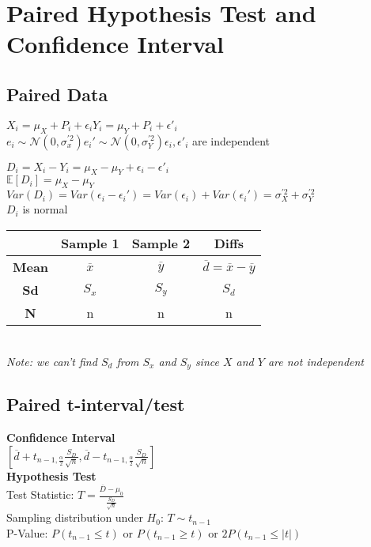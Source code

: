 \documentclass{article}
\begin{document}
\section{Paired Hypothesis Test and Confidence Interval}
\label{sec:pair}
\subsection{Paired Data}
\begin{center}
    $X_i=\mu_X+P_i+\epsilon_i$\hspace*{0.5in}$Y_i=\mu_Y+P_i+\epsilon'_i$\\
    $e_i\sim\mathcal{N}(0,\sigma_x^{'2})$\hspace*{0.5in}$e_i'\sim\mathcal{N}(0,\sigma_Y^{'2})$\hspace*{0.5in}$\epsilon_i,\epsilon'_i$ are independent
\end{center}
$D_i=X_i-Y_i=\mu_X-\mu_Y+\epsilon_i-\epsilon'_i$\\
$\mathbb{E}[D_i]=\mu_X-\mu_Y$\\
$Var(D_i)=Var(\epsilon_i-\epsilon_i')=Var(\epsilon_i)+Var(\epsilon_i')=\sigma_X^{'2}+\sigma_Y^{'2}$\\
$D_i$ is normal\\
\begin{tabular}{c|c|c|c}
     & \textbf{Sample 1} & \textbf{Sample 2} & \textbf{Diffs} \\
     \hline
    \textbf{Mean} & $\overline{x}$ & $\overline{y}$ & $\overline{d}=\overline{x}-\overline{y}$\\
    \hline
    \textbf{Sd} & $S_x$ & $S_y$ & $S_d$\\
    \hline
    \textbf{N} & n & n & n
\end{tabular}\\
\textit{Note: we can't find $S_d$ from $S_x$ and $S_y$ since $X$ and $Y$ are not independent}
\subsection{Paired t-interval/test}
\textbf{Confidence Interval}\\
 $[\overline{d}+t_{n-1,\frac{\alpha}{2}}\frac{S_D}{\sqrt{n}},\overline{d}-t_{n-1,\frac{\alpha}{2}}\frac{S_D}{\sqrt{n}}]$\\
 \textbf{Hypothesis Test}\\
 Test Statistic: $T=\frac{\overline{D}-\mu_0}{\frac{S_D}{\sqrt{n}}}$\\
 Sampling distribution under $H_0$: $T\sim t_{n-1}$\\
 P-Value: $P(t_{n-1}\leq t)$ or $P(t_{n-1}\geq t)$ or $2P(t_{n-1}\leq\vert t\vert)$
\end{document}
